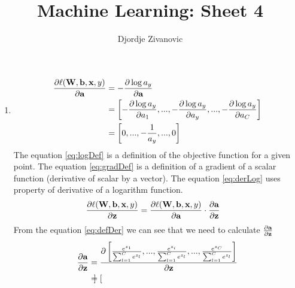 \documentclass[10pt,a4paper]{article}
\author{Djordje Zivanovic}
\title{\textbf{Machine Learning: Sheet 4}}
\begin{document}
\maketitle
\bigskip
\newcommand{\transpose}[1]{#1 ^ \text{T}}
\newcommand{\mat}[1]{\textbf{\text{{#1}}}}
\newcommand{\vect}[1]{\mat{#1}}
\newcommand{\gradient}[1]{\nabla_{\vect{#1}}}
\newcommand{\der}[1]{\frac{\partial}{\partial #1}}
\newcommand{\numberthis}{\addtocounter{equation}{1}\tag{\theequation}}
\newcommand{\logfun}{\sigma(\transpose{\vect{x}}_i \vect{w})}
\newcommand{\softmaxi}{\frac{e^{z_i}}{\sum_{l=1}^Ce^{z_l}}}
\newcommand{\layersep}{2.5cm}
\newcommand{\layersepH}{6cm}
\newcommand{\layersepP}{7cm}
\newcommand{\layersepB}{9cm}
\begin{enumerate}
\item 
\begin{align}
\frac{\partial \ell (\mat{W}, \vect{b}, \vect{x}, y)}{\partial \vect{a}} 
&= -\frac{\partial \log a_y}{\partial \vect{a}} \label{eq:logDef}\\
&= \left[ -\frac{\partial \log a_y}{\partial a_1}, ..., -\frac{\partial \log a_y}{\partial a_y}, ..., -\frac{\partial \log a_y}{\partial a_C}  \right] \label{eq:gradDef}\\
&= \left[0, ..., -\frac{1}{a_y}, ..., 0\right] \label{eq:derLog}
\end{align}
The equation \ref{eq:logDef} is a definition of the objective function for a given point. The equation \ref{eq:gradDef} is a definition of a gradient of a scalar function (derivative of scalar by a vector). The equation \ref{eq:derLog} uses property of derivative of a logarithm function.
\begin{align}
\frac{\partial \ell (\mat{W}, \vect{b}, \vect{x}, y)}{\partial \vect{z}} 
&=\frac{\partial \ell (\mat{W}, \vect{b}, \vect{x}, y)}{\partial \vect{a}}
\cdot \frac{\partial \vect{a}}{\partial \vect{z}}   \label{eq:defDer}
\end{align}
From the equation \ref{eq:defDer} we can see that we need to calculate $\frac{\partial\vect{a}}{\partial\vect{z}}$
\begin{align}
\frac{\partial \vect{a}}{\partial \vect{z}} 
&=\frac{\partial \left[ \frac{ e^{z_{1}}}{\sum_{l=1}^{C}e^{z_{l}}}, ..., \frac{ e^{z_{i}}}{\sum_{l=1}^{C}e^{z_{l}}},..., \frac{ e^{z_{C}}}{\sum_{l=1}^{C}e^{z_{l}}} \right]}{\partial \vect{z}}  \label{eq:softMax}\\
&=\begin{bmatrix}

\end{bmatrix}
\end{align}
\end{enumerate}
\end{document}
